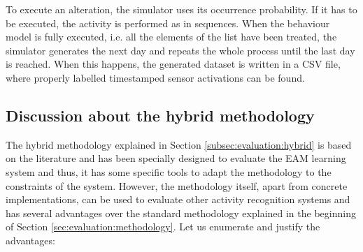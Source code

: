 To execute an alteration, the simulator uses its occurrence probability. If it has to be executed, the activity is performed as in sequences. When the behaviour model is fully executed, i.e. all the elements of the list have been treated, the simulator generates the next day and repeats the whole process until the last day is reached. When this happens, the generated dataset is written in a CSV file, where properly labelled timestamped sensor activations can be found.

\subsection{Discussion about the hybrid methodology}
\label{subsec:evaluation:hybrid:discussion}
\begin{comment}
- Explain the advantages: generate virtually infinite datasets, arbitrary number of days, perfectly labelled, sensor noise, erratic behaviour, realistic time lapses
 - Explain the main disadvantages: erratic behaviour difficult to capture
 \end{comment}
The hybrid methodology explained in Section \ref{subsec:evaluation:hybrid} is based on the literature and has been specially designed to evaluate the EAM learning system and thus, it has some specific tools to adapt the methodology to the constraints of the system. However, the methodology itself, apart from concrete implementations, can be used to evaluate other activity recognition systems and has several advantages over the standard methodology explained in the beginning of Section \ref{sec:evaluation:methodology}. Let us enumerate and justify the advantages:


